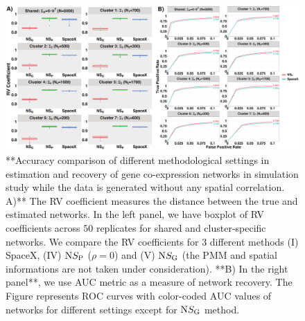 \documentclass[
]{book}
\begin{document}
\begin{figure}

{\centering \includegraphics[width=176.18in]{images/Null_sim_RV_ROC} 

}

\caption{ **Accuracy comparison of different methodological settings in estimation and recovery of gene co-expression networks in simulation study while the data is generated without any spatial correlation. A)** The RV coefficient measures the distance between the true and estimated networks. In the left panel, we have boxplot of RV coefficients across $50$ replicates for shared and cluster-specific networks. We compare the RV coefficients for 3 different methods (I) SpaceX, (IV) $\text NS_{\text P}$ ($\rho = 0$) and (V) $\text NS_{\text G}$ (the PMM and spatial informations are not taken under consideration). **B) In the right panel**, we use AUC metric as a measure of network recovery. The Figure represents ROC curves with color-coded AUC values of networks for different settings except for $\text NS_{\text G}$ method.}\label{fig:nullsimulationRVAUC}
\end{figure}
\end{document}
